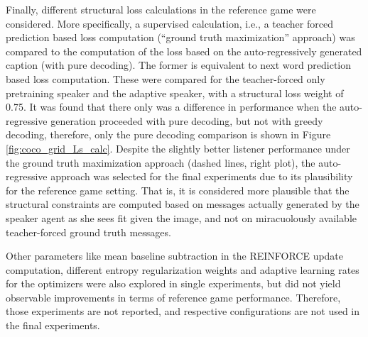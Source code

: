 Finally, different structural loss calculations in the reference game were considered. More specifically, a supervised calculation, i.e., a teacher forced prediction  based loss computation (``ground truth maximization'' approach)  was compared to the computation of the loss based on the auto-regressively generated caption (with pure decoding). The former is equivalent to next word prediction based loss computation. These were compared for the teacher-forced only pretraining speaker and the adaptive speaker, with a structural loss weight of 0.75.
It was found that there only was a difference in performance when the auto-regressive generation proceeded with pure decoding, but not with greedy decoding, therefore, only the pure decoding comparison is shown in Figure \ref{fig:coco_grid_Ls_calc}. Despite the slightly better listener performance under the ground truth maximization approach (dashed lines, right plot), the auto-regressive approach was selected for the final experiments due to its plausibility for the reference game setting. That is, it is considered more plausible that the structural constraints are computed based on messages actually generated by the speaker agent as she sees fit given the image, and not on miracuolously available teacher-forced ground truth messages. 

Other parameters like mean baseline subtraction in the REINFORCE update computation, different entropy regularization weights and adaptive learning rates for the optimizers were also explored in single experiments, but did not yield observable improvements in terms of reference game performance. Therefore, those experiments are not reported, and respective configurations are not used in the final experiments.
